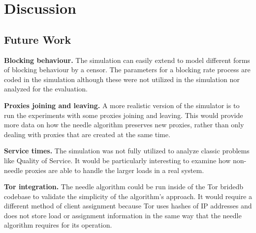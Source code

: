 \chapter{Discussion}
\label{sec:discussion}

\section{Future Work}

\textbf{Blocking behaviour.} The simulation can easily extend to model different forms of blocking behaviour by a censor. The parameters for a blocking rate process are coded in the simulation although these were not utilized in the simulation nor analyzed for the evaluation.  

\textbf{Proxies joining and leaving.} A more realistic version of the simulator is to run the experiments with some proxies joining and leaving. This would provide more data on how the needle algorithm preserves new proxies, rather than only dealing with proxies that are created at the same time.

\textbf{Service times.} The simulation was not fully utilized to analyze classic problems like Quality of Service. It would be particularly interesting to examine how non-needle proxies are able to handle the larger loads in a real system.

\textbf{Tor integration.} The needle algorithm could be run inside of the Tor bridedb codebase to validate the simplicity of the algorithm's approach. It would require a different method of client assignment because Tor uses hashes of IP addresses and does not store load or assignment information in the same way that the needle algorithm requires for its operation.